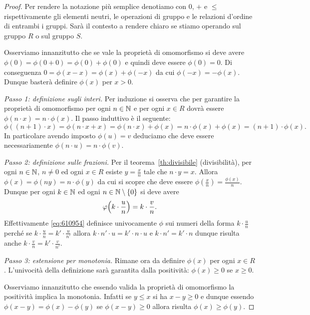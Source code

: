 \begin{proof}
Per rendere la notazione più semplice denotiamo con $0$, $+$ e $\le$ 
rispettivamente gli elementi neutri, le operazioni di gruppo 
e le relazioni d'ordine di entrambi i gruppi. 
Sarà il contesto a rendere chiaro se stiamo operando sul gruppo $R$ 
o sul gruppo $S$.

Osserviamo innanzitutto che se vale la proprietà di omomorfismo
si deve avere
$\phi(0) = \phi(0+0) = \phi(0)+\phi(0)$
e quindi deve essere $\phi(0)=0$.
Di conseguenza $0=\phi(x-x) = \phi(x)+\phi(-x)$
da cui $\phi(-x) = -\phi(x)$.
Dunque basterà definire $\phi(x)$ per $x>0$.

\emph{Passo 1: definizione sugli interi.}
Per induzione si osserva che per garantire la proprietà 
di omomorfismo per ogni $n\in {\mathbb N}$ e per ogni $x\in R$ 
dovrà essere $\phi(n\cdot x) = n\cdot \phi(x)$. 
Il passo induttivo è il seguente:
\[
  \phi((n+1)\cdot x) 
  = \phi(n\cdot x + x)
  = \phi(n\cdot x) + \phi(x)
  = n\cdot \phi(x) + \phi(x)
  = (n+1)\cdot \phi(x).
\]
In particolare avendo imposto $\phi(u)=v$ deduciamo che deve essere 
necessariamente $\phi(n\cdot u) = n\cdot \phi(v)$.

\emph{Passo 2: definizione sulle frazioni.}
Per il teorema~\ref{th:divisibile} (divisibilità), per ogni $n\in {\mathbb N}$, $n\neq 0$ 
ed ogni $x\in R$ esiste $y=\frac{x}{n}$ tale che $n\cdot y=x$.
Allora $\phi(x) = \phi(ny)=n\cdot \phi(y)$ da cui 
si scopre che deve essere $\phi(\frac x n) = \frac{\phi(x)}{n}$.
Dunque per ogni $k\in {\mathbb N}$ ed ogni $n\in {\mathbb N}\setminus{\left\{ 0 \right\}}$
si deve avere 
\begin{equation}\label{eq:610954}
  \varphi{\left( k\cdot \frac u n \right)} = k \cdot \frac v n.
\end{equation}
Effettivamente \eqref{eq:610954} definisce univocamente 
$\phi$ sui numeri della forma $k\cdot \frac u n$ perché 
se $k\cdot \frac u n = k'\cdot \frac u {n'}$ allora 
$k \cdot n'\cdot  u = k' \cdot n\cdot u$
e $k\cdot n' = k'\cdot n$ dunque risulta anche 
$k\cdot \frac v n = k'\cdot \frac v {n'}$.

\emph{Passo 3: estensione per monotonia.}
Rimane ora da definire $\phi(x)$ per ogni $x\in R$.
L'univocità della definizione sarà garantita dalla positività:
$\phi(x)\ge 0$ se $x\ge 0$.

Osserviamo innanzitutto che essendo valida la proprietà di omomorfismo
la positività implica la monotonia. 
Infatti se $y\le x$ si ha $x-y\ge 0$
e dunque essendo $\phi(x-y) = \phi(x) - \phi(y)$
se $\phi(x-y)\ge 0$ allora risulta $\phi(x)\ge \phi(y)$. 


\end{proof}
